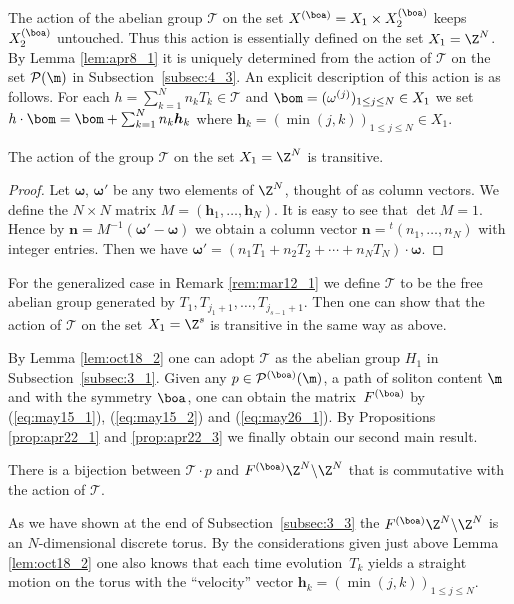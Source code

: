 The action of the abelian group ${\mathcal T}$ on the set $X^{(\boa)} = X_1 \times X_2^{(\boa)}$
keeps $X_2^{(\boa)}$ untouched.
Thus this action is essentially def\/ined on the set $X_1 = \Z^N$.
%
By Lemma \ref{lem:apr8_1} it is uniquely determined from the action of ${\mathcal T}$ on the set ${\mathcal P}(\m)$
in Subsection~\ref{subsec:4_3}.
%
An explicit description of this action is as follows.
For each $h = \sum_{k=1}^N n_k T_k \in {\mathcal T}$ and $\bom = (\omega^{(j)})_{1 \leq j \leq N} \in X_1$
we set $h \cdot \bom = \bom + \sum_{k=1}^N n_k \boldsymbol{h}_k$ where
$\boldsymbol{h}_k = (\min(j,k))_{1 \leq j \leq N} \in X_1$.


\begin{lemma}\label{lem:oct18_2}
The action of the group ${\mathcal T}$ on the set $X_1 = \Z^N$ is transitive.
\end{lemma}
\begin{proof}
Let $\boldsymbol{\omega}$, $\boldsymbol{\omega'}$ be any two elements of $\Z^N$,
thought of as column vectors.
We def\/ine the $N \times N$ matrix $M = (\boldsymbol{h}_1,\ldots,\boldsymbol{h}_N)$.
It is easy to see that $\det M = 1$.
Hence by $\boldsymbol{n} =M^{-1} (\boldsymbol{\omega'} - \boldsymbol{\omega})$
we obtain a column vector $\boldsymbol{n} = {}^t (n_1,\ldots,n_N)$ with integer entries.
Then we have $\boldsymbol{\omega'} =(n_1 T_1 + n_2 T_2 + \cdots + n_N T_N) \cdot \boldsymbol{\omega}$.
\end{proof}
%
\begin{remark}\label{rem:may8_1}
For the generalized case in Remark \ref{rem:mar12_1}
we def\/ine ${\mathcal T}$ to be the free abelian group
generated by $T_1, T_{j_1+1},\ldots, T_{j_{s-1}+1}$.
Then one can show that the action of ${\mathcal T}$ on the set $X_1=\Z^s$ is transitive
in the same way as above.
\end{remark}


By Lemma \ref{lem:oct18_2} one can adopt ${\mathcal T}$ as the abelian group $H_1$ in Subsection~\ref{subsec:3_1}.
Given any $p \in {\mathcal P}^{(\boa)}(\m)$, a path of soliton content $\m$ and with the symmetry $\boa$,
one can obtain the matrix~$F^{(\boa)}$ by (\ref{eq:may15_1}),
(\ref{eq:may15_2}) and (\ref{eq:may26_1}).
By Propositions \ref{prop:apr22_1} and \ref{prop:apr22_3} we f\/inally obtain our second main result.
\begin{theorem}\label{th:main}
There is a bijection between ${\mathcal T} \cdot p$ and $F^{(\boa)} \Z^N \backslash \Z^N$
that is commutative with the action of ${\mathcal T}$.
\end{theorem}


As we have shown at the end of Subsection~\ref{subsec:3_3} the $F^{(\boa)} \Z^N \backslash \Z^N$ is an $N$-dimensional discrete torus.
%
By the considerations given just above Lemma \ref{lem:oct18_2} one also knows that
each time evolution~$T_k$ yields a straight motion on the torus with the ``velocity'' vector
$\boldsymbol{h}_k = (\min(j,k))_{1 \leq j \leq N}$.

